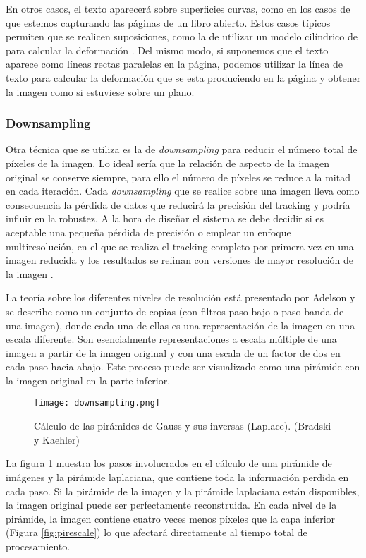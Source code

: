 En otros casos, el texto aparecerá sobre superficies curvas, como en los casos de que estemos capturando las páginas de un libro abierto. Estos casos típicos permiten que se realicen suposiciones, como la de utilizar un modelo cilíndrico de para calcular la deformación \cite{Kanungo}. Del mismo modo, si suponemos que el texto aparece como líneas rectas paralelas en la página, podemos utilizar la línea de texto para calcular la deformación que se esta produciendo en la página y obtener la imagen como si estuviese sobre un plano.

\subsubsection{Downsampling}
Otra técnica que se utiliza es la de \emph{downsampling} para reducir el número total de píxeles de la imagen. Lo ideal sería que la relación de aspecto de la imagen original se conserve siempre, para ello el número de píxeles se reduce a la mitad en cada iteración. Cada \emph{downsampling} que se realice sobre una imagen lleva como consecuencia la pérdida de datos que reducirá la precisión del tracking y podría influir en la robustez. A la hora de diseñar el sistema se debe decidir si es aceptable una pequeña pérdida de precisión o emplear un enfoque multiresolución, en el que se realiza el tracking completo por primera vez en una imagen reducida y los resultados se refinan con versiones de mayor resolución de la imagen \cite{Klein}.

La teoría sobre los diferentes niveles de resolución está presentado por Adelson \cite{Adelson} y se describe como un conjunto de copias (con filtros paso bajo o paso banda de una imagen), donde cada una de ellas es una representación de la imagen en una escala diferente. Son esencialmente representaciones a escala múltiple de una imagen a partir de la imagen original y con una escala de un factor de dos en cada paso hacia abajo. Este proceso puede ser visualizado como una pirámide con la imagen original en la parte inferior. 

\begin{figure}
  \centering
  \texttt{[image: downsampling.png]}
  \caption{Cálculo de las pirámides de Gauss y sus inversas (Laplace). (Bradski y Kaehler)}

  \label{fig:pirámides}
\end{figure}

La figura \ref{fig:pirámides} muestra los pasos involucrados en el cálculo de una pirámide de imágenes y la pirámide laplaciana, que contiene toda la información perdida en cada paso. Si la pirámide de la imagen y la pirámide laplaciana están disponibles, la imagen original puede ser perfectamente reconstruida. En cada nivel de la pirámide, la imagen contiene cuatro veces menos píxeles que la capa inferior (Figura \ref{fig:pirescale}) lo que afectará directamente al tiempo total de procesamiento. 

